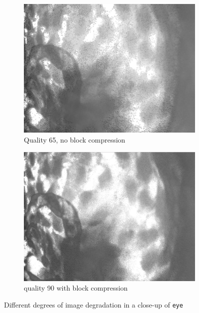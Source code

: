 \begin{figure}
\begin{subfigure}{.49\textwidth}
\centering
    \includegraphics[width=\textwidth]{results/quality_65.png} 
    \caption{Quality 65, no block compression}
    \label{fig:quality1}
\end{subfigure}
\begin{subfigure}{.49\textwidth}
\centering
    \includegraphics[width=\textwidth]{results/quality_90bc.png} 
    \caption{quality 90 with block compression}
    \label{fig:quality2}
\end{subfigure}

\caption{Different degrees of image degradation in a close-up of \texttt{eye}}
\label{fig:quality}
\end{figure}
